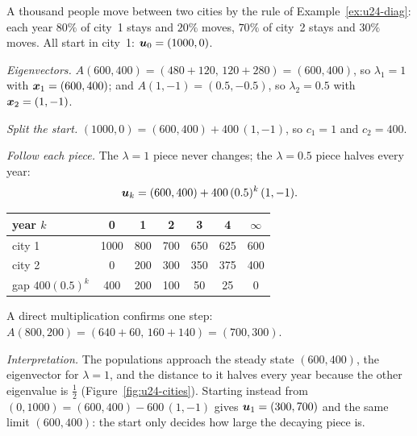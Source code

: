 \begin{example}\label{ex:u24-cities}
A thousand people move between two cities by the rule of Example~\ref{ex:u24-diag}: each
year $80\%$ of city~1 stays and $20\%$ moves, $70\%$ of city~2 stays and $30\%$ moves. All
start in city~1: $\boldsymbol{u}_0=(1000,0)$.

\emph{Eigenvectors.} $A(600,400)=(480+120,\,120+280)=(600,400)$, so $\lambda_1=1$ with
$\boldsymbol{x}_1=(600,400)$; and $A(1,-1)=(0.5,-0.5)$, so $\lambda_2=0.5$ with $\boldsymbol{x}_2=(1,-1)$.

\emph{Split the start.} $(1000,0)=(600,400)+400\,(1,-1)$, so $c_1=1$ and $c_2=400$.

\emph{Follow each piece.} The $\lambda=1$ piece never changes; the $\lambda=0.5$ piece
halves every year:
\[
  \boldsymbol{u}_k=(600,400)+400\,(0.5)^{k}\,(1,-1).
\]
\begin{center}
\begin{tabular}{@{}lcccccc@{}}
\toprule
year $k$ & 0 & 1 & 2 & 3 & 4 & $\infty$\\
\midrule
city 1 & 1000 & 800 & 700 & 650 & 625 & 600\\
city 2 & 0 & 200 & 300 & 350 & 375 & 400\\
gap $400(0.5)^{k}$ & 400 & 200 & 100 & 50 & 25 & 0\\
\bottomrule
\end{tabular}
\end{center}
A direct multiplication confirms one step: $A(800,200)=(640+60,\,160+140)=(700,300)$.

\emph{Interpretation.} The populations approach the steady state $(600,400)$, the
eigenvector for $\lambda=1$, and the distance to it halves every year because the other
eigenvalue is $\tfrac12$ (Figure~\ref{fig:u24-cities}). Starting instead from
$(0,1000)=(600,400)-600\,(1,-1)$ gives $\boldsymbol{u}_1=(300,700)$ and the same limit $(600,400)$:
the start only decides how large the decaying piece is.
\end{example}

